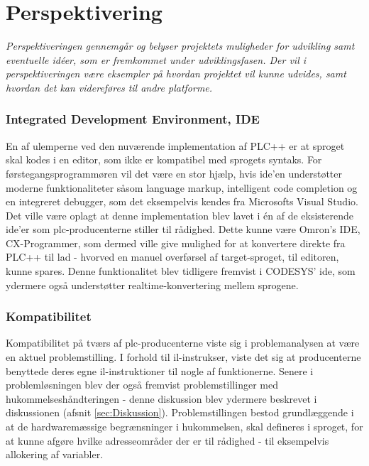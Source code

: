 \chapter{Perspektivering}
\label{sec:Perspektivering}
\textit{Perspektiveringen gennemgår og belyser projektets muligheder for udvikling samt eventuelle idéer, som er fremkommet under udviklingsfasen. Der vil i perspektiveringen være eksempler på hvordan projektet vil kunne udvides, samt hvordan det kan videreføres til andre platforme.}

\subsection*{Integrated Development Environment, IDE}
En af ulemperne ved den nuværende implementation af PLC++ er at sproget skal kodes i en editor, som ikke er kompatibel med sprogets syntaks. For førstegangsprogrammøren vil det være en stor hjælp, hvis \gls{ide}'en understøtter moderne funktionaliteter såsom language markup, intelligent code completion og en integreret debugger, som det eksempelvis kendes fra Microsofts Visual Studio. \\

\noindent Det ville være oplagt at denne implementation blev lavet i én af de eksisterende \gls{ide}'er som \gls{plc}-producenterne stiller til rådighed. Dette kunne være Omron’s IDE, CX-Programmer, som dermed ville give mulighed for at konvertere direkte fra PLC++ til \gls{lad} - hvorved en manuel overførsel af target-sproget, til editoren, kunne spares. Denne funktionalitet blev tidligere fremvist i CODESYS' \gls{ide}, som ydermere også understøtter realtime-konvertering mellem sprogene. 

\subsection*{Kompatibilitet}
Kompatibilitet på tværs af \gls{plc}-producenterne viste sig i problemanalysen at være en aktuel problemstilling. I forhold til \gls{il}-instrukser, viste det sig at producenterne benyttede deres egne \gls{il}-instruktioner til nogle af funktionerne. Senere i problemløsningen blev der også fremvist problemstillinger med hukommelseshåndteringen - denne diskussion blev ydermere beskrevet i diskussionen (afsnit \ref{sec:Diskussion}). Problemstillingen bestod grundlæggende i at de hardwaremæssige begrænsninger i hukommelsen, skal defineres i sproget, for at kunne afgøre hvilke adresseområder der er til rådighed - til eksempelvis allokering af variabler. 

